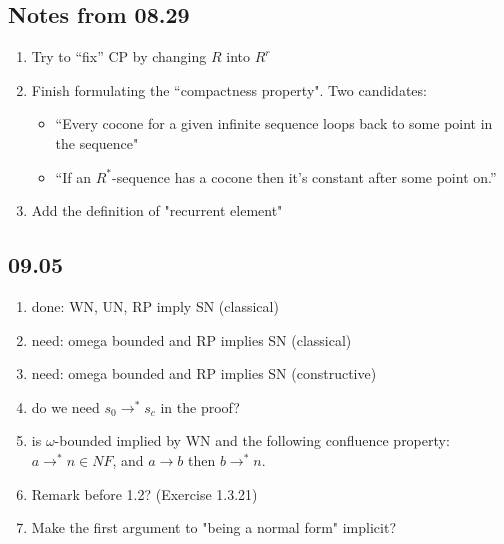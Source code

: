 \documentclass{scrartcl}
\begin{document}
\subsection{Notes from 08.29}
\begin{enumerate}
  \item Try to ``fix'' CP by changing $R$ into $R^r$
  \item Finish formulating the ``compactness property".  Two candidates:
  \begin{itemize}
    \item ``Every cocone for a given infinite sequence loops back to some point in the sequence"
    \item ``If an $R^*$-sequence has a cocone then it's constant after some point on.''
  \end{itemize}
  \item Add the definition of "recurrent element"
\end{enumerate}

\subsection{09.05}
\begin{enumerate}
  \item done: WN, UN, RP imply SN (classical)
  \item need: omega bounded and RP implies SN (classical)
  \item need: omega bounded and RP implies SN (constructive)
  \item do we need $s_0 \to^* s_c$ in the proof?
  \item is $\omega$-bounded implied by WN and the following confluence property:
  $a \to^* n \in NF$, and $a \to b$ then $b \to^* n $.
  \item Remark before 1.2? (Exercise 1.3.21)
  \item Make the first argument to "being a normal form" implicit?
\end{enumerate}

\newcommand{\RP}{\mathsf{RP}}
\newcommand{\NF}{\mathsf{NF}}
\newcommand{\UN}{\mathsf{UN}}
\newcommand{\UNto}{\mathsf{UN}{\to}}
\newcommand{\SN}{\mathsf{SN}}
\newcommand{\WN}{\mathsf{WN}}
\newcommand{\from}{\leftarrow}
\end{document}
